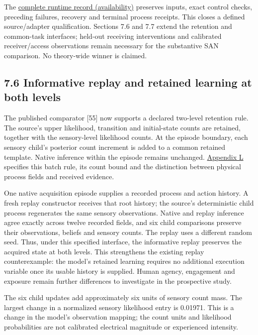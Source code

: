\documentclass[
  american,
  11pt,
  letterpaper,
]{article}
\begin{document}
The \href{https://github.com/v5ma/v5ma.github.io/blob/master/papers/companions/learning-to-feel-v1.0/ARTIFACT-AVAILABILITY.md\#artifact-39}{complete runtime record (availability)} preserves inputs, exact control checks, preceding failures, recovery and terminal process receipts. This closes a defined source/adapter qualification. Sections 7.6 and 7.7 extend the retention and common-task interfaces; held-out receiving interventions and calibrated receiver/access observations remain necessary for the substantive SAN comparison. No theory-wide winner is claimed.

\subsection{7.6 Informative replay and retained learning at both levels}\label{informative-replay-and-retained-learning-at-both-levels}

The published comparator {[}55{]} now supports a declared two-level retention rule. The source's upper likelihood, transition and initial-state counts are retained, together with the sensory-level likelihood counts. At the episode boundary, each sensory child's posterior count increment is added to a common retained template. Native inference within the episode remains unchanged. \href{https://zenodo.org/records/23509961/files/Learning-to-Feel-Technical-Supplement-v1.1.pdf\#appendix-l}{Appendix L} specifies this batch rule, its count bound and the distinction between physical process fields and received evidence.

One native acquisition episode supplies a recorded process and action history. A fresh replay constructor receives that root history; the source's deterministic child process regenerates the same sensory observations. Native and replay inference agree exactly across twelve recorded fields, and six child comparisons preserve their observations, beliefs and sensory counts. The replay uses a different random seed. Thus, under this specified interface, the informative replay preserves the acquired state at both levels. This strengthens the existing replay counterexample: the model's retained learning requires no additional execution variable once its usable history is supplied. Human agency, engagement and exposure remain further differences to investigate in the prospective study.

The six child updates add approximately six units of sensory count mass. The largest change in a normalized sensory likelihood entry is 0.01971. This is a change in the model's observation mapping; the count units and likelihood probabilities are not calibrated electrical magnitude or experienced intensity.
\end{document}
